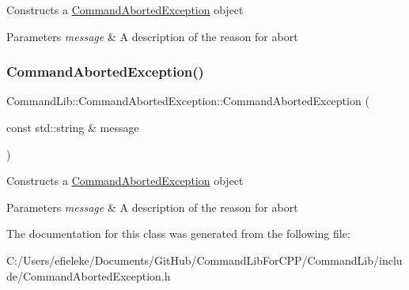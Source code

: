 Constructs a \mbox{\hyperlink{class_command_lib_1_1_command_aborted_exception}{Command\+Aborted\+Exception}} object 


\begin{DoxyParams}{Parameters}
{\em message} & A description of the reason for abort\\
\hline
\end{DoxyParams}
\mbox{\label{class_command_lib_1_1_command_aborted_exception_a26303ba9a320b9734678fb46575326c4}} 
\subsubsection{\texorpdfstring{Command\+Aborted\+Exception()}{CommandAbortedException()}\hspace{0.1cm}{\footnotesize\ttfamily [3/3]}}
{\footnotesize\ttfamily Command\+Lib\+::\+Command\+Aborted\+Exception\+::\+Command\+Aborted\+Exception (\begin{DoxyParamCaption}\item[{const std\+::string \&}]{message }\end{DoxyParamCaption})\hspace{0.3cm}{\ttfamily [explicit]}}



Constructs a \mbox{\hyperlink{class_command_lib_1_1_command_aborted_exception}{Command\+Aborted\+Exception}} object 


\begin{DoxyParams}{Parameters}
{\em message} & A description of the reason for abort\\
\hline
\end{DoxyParams}


The documentation for this class was generated from the following file\+:\begin{DoxyCompactItemize}
\item 
C\+:/\+Users/efieleke/\+Documents/\+Git\+Hub/\+Command\+Lib\+For\+C\+P\+P/\+Command\+Lib/include/Command\+Aborted\+Exception.\+h\end{DoxyCompactItemize}
